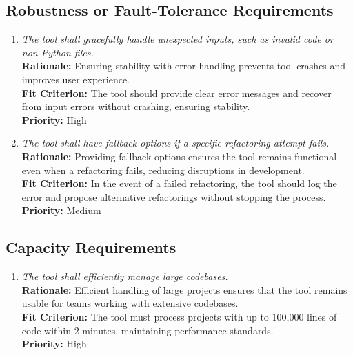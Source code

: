 \documentclass[12pt]{article}
\begin{document}
\subsection{Robustness or Fault-Tolerance Requirements}
\begin{enumerate}[label=PR-RFT \arabic*., wide=0pt, leftmargin=*]
    \item \emph{The tool shall gracefully handle unexpected inputs, such as invalid code or non-Python files.}\\
    {\bf Rationale:} Ensuring stability with error handling prevents tool crashes and improves user experience.\\
    {\bf Fit Criterion:} The tool should provide clear error messages and recover from input errors without crashing, ensuring stability.\\
    {\bf Priority:} High
    \item \emph{The tool shall have fallback options if a specific refactoring attempt fails.}\\
    {\bf Rationale:} Providing fallback options ensures the tool remains functional even when a refactoring fails, reducing disruptions in development.\\
    {\bf Fit Criterion:} In the event of a failed refactoring, the tool should log the error and propose alternative refactorings without stopping the process.\\
    {\bf Priority:} Medium
\end{enumerate}
\subsection{Capacity Requirements}
\begin{enumerate}[label=PR-CR \arabic*., wide=0pt, leftmargin=*]
    \item \emph{The tool shall efficiently manage large codebases.}\\
    {\bf Rationale:} Efficient handling of large projects ensures that the tool remains usable for teams working with extensive codebases.\\
    {\bf Fit Criterion:} The tool must process projects with up to 100,000 lines of code within 2 minutes, maintaining performance standards.\\
    {\bf Priority:} High
\end{enumerate}
\end{document}
